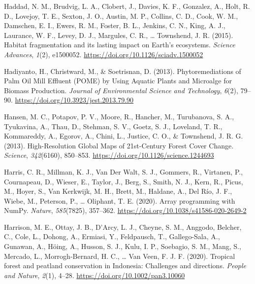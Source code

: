 \documentclass[
  letterpaper,
  DIV=11,
  numbers=noendperiod]{scrreprt}
\newlength{\cslhangindent}
\newlength{\cslentryspacingunit} %
\newenvironment{CSLReferences}[2] %
 {%
  \setlength{\parindent}{0pt}
  \ifodd #1
  \let\oldpar\par
  \def\par{\hangindent=\cslhangindent\oldpar}
  \fi
  \setlength{\parskip}{#2\cslentryspacingunit}
 }%
 {}
\begin{document}
\begin{CSLReferences}{1}{0}
\leavevmode{}%
Haddad, N. M., Brudvig, L. A., Clobert, J., Davies, K. F., Gonzalez, A.,
Holt, R. D., Lovejoy, T. E., Sexton, J. O., Austin, M. P., Collins, C.
D., Cook, W. M., Damschen, E. I., Ewers, R. M., Foster, B. L., Jenkins,
C. N., King, A. J., Laurance, W. F., Levey, D. J., Margules, C. R.,
\ldots{} Townshend, J. R. (2015). Habitat fragmentation and its lasting
impact on {Earth}'s ecosystems. \emph{Science Advances}, \emph{1}(2),
e1500052. \url{https://doi.org/10.1126/sciadv.1500052}

\leavevmode{}%
Hadiyanto, H., Christward, M., \& Soetrisnan, D. (2013).
Phytoremediations of {Palm Oil Mill Effluent} ({POME}) by {Using Aquatic
Plants} and {Microalge} for {Biomass Production}. \emph{Journal of
Environmental Science and Technology}, \emph{6}(2), 79--90.
\url{https://doi.org/10.3923/jest.2013.79.90}

\leavevmode{}%
Hansen, M. C., Potapov, P. V., Moore, R., Hancher, M., Turubanova, S.
A., Tyukavina, A., Thau, D., Stehman, S. V., Goetz, S. J., Loveland, T.
R., Kommareddy, A., Egorov, A., Chini, L., Justice, C. O., \& Townshend,
J. R. G. (2013). High-{Resolution Global Maps} of 21st-{Century Forest
Cover Change}. \emph{Science}, \emph{342}(6160), 850--853.
\url{https://doi.org/10.1126/science.1244693}

\leavevmode{}%
Harris, C. R., Millman, K. J., Van Der Walt, S. J., Gommers, R.,
Virtanen, P., Cournapeau, D., Wieser, E., Taylor, J., Berg, S., Smith,
N. J., Kern, R., Picus, M., Hoyer, S., Van Kerkwijk, M. H., Brett, M.,
Haldane, A., Del Río, J. F., Wiebe, M., Peterson, P., \ldots{} Oliphant,
T. E. (2020). Array programming with {NumPy}. \emph{Nature},
\emph{585}(7825), 357--362.
\url{https://doi.org/10.1038/s41586-020-2649-2}

\leavevmode{}%
Harrison, M. E., Ottay, J. B., D'Arcy, L. J., Cheyne, S. M., Anggodo,
Belcher, C., Cole, L., Dohong, A., Ermiasi, Y., Feldpausch, T.,
Gallego-Sala, A., Gunawan, A., Höing, A., Husson, S. J., Kulu, I. P.,
Soebagio, S. M., Mang, S., Mercado, L., Morrogh-Bernard, H. C., \ldots{}
Van Veen, F. J. F. (2020). Tropical forest and peatland conservation in
{Indonesia}: {Challenges} and directions. \emph{People and Nature},
\emph{2}(1), 4--28. \url{https://doi.org/10.1002/pan3.10060}


\end{CSLReferences}
\end{document}
